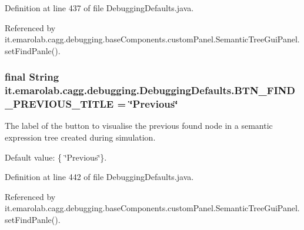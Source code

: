 Definition at line 437 of file Debugging\-Defaults.\-java.



Referenced by it.\-emarolab.\-cagg.\-debugging.\-base\-Components.\-custom\-Panel.\-Semantic\-Tree\-Gui\-Panel.\-set\-Find\-Panle().

\hypertarget{classit_1_1emarolab_1_1cagg_1_1debugging_1_1DebuggingDefaults_a63c88f4a12bcab1feb1bc90029c96e62}{
\subsubsection[{B\-T\-N\-\_\-\-F\-I\-N\-D\-\_\-\-P\-R\-E\-V\-I\-O\-U\-S\-\_\-\-T\-I\-T\-L\-E}]{\setlength{\rightskip}{0pt plus 5cm}final String it.\-emarolab.\-cagg.\-debugging.\-Debugging\-Defaults.\-B\-T\-N\-\_\-\-F\-I\-N\-D\-\_\-\-P\-R\-E\-V\-I\-O\-U\-S\-\_\-\-T\-I\-T\-L\-E = \char`\"{}Previous\char`\"{}\hspace{0.3cm}{\ttfamily [static]}}}\label{classit_1_1emarolab_1_1cagg_1_1debugging_1_1DebuggingDefaults_a63c88f4a12bcab1feb1bc90029c96e62}
The label of the button to visualise the previous found node in a semantic expression tree created during simulation. \par
 Default value\-: \{ \char`\"{}\-Previous\char`\"{}\}. 

Definition at line 442 of file Debugging\-Defaults.\-java.



Referenced by it.\-emarolab.\-cagg.\-debugging.\-base\-Components.\-custom\-Panel.\-Semantic\-Tree\-Gui\-Panel.\-set\-Find\-Panle().

